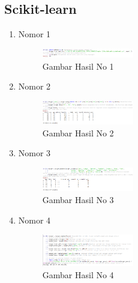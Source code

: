 \subsection{Scikit-learn}
\begin{enumerate}
	\item Nomor 1
	\hfill\break
	
\begin{figure}[H]
	\includegraphics[width=4cm]{figures/1174062/2/ScikitLearn/Nomor 1.png}
	\centering
	\caption{Gambar Hasil No 1 }
\end{figure}
	
\item Nomor 2
	\hfill\break
	
	
\begin{figure}[H]
	\includegraphics[width=4cm]{figures/1174062/2/ScikitLearn/Nomor 2.png}
	\centering
	\caption{Gambar Hasil No 2 }
\end{figure}
	
\item Nomor 3
	\hfill\break
	
	
\begin{figure}[H]
	\includegraphics[width=4cm]{figures/1174062/2/ScikitLearn/Nomor 3.png}
	\centering
	\caption{Gambar Hasil No 3 }
\end{figure}

\item Nomor 4
	\hfill\break
	
	
\begin{figure}[H]
	\includegraphics[width=4cm]{figures/1174062/2/ScikitLearn/Nomor 4.png}
	\centering
	\caption{Gambar Hasil No 4 }
\end{figure}


\end{enumerate}
